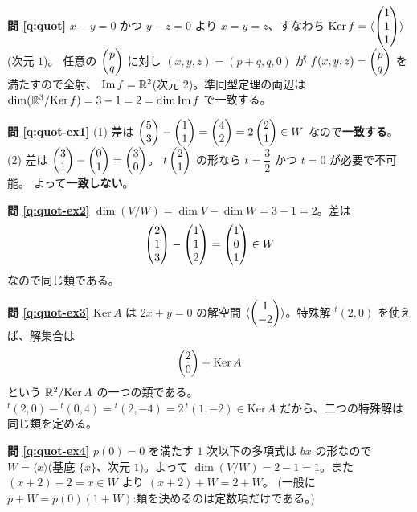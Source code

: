 \bigskip
\noindent\textbf{問 \ref{q:quot}}\quad
$x - y = 0$ かつ $y - z = 0$ より $x = y = z$、すなわち
$\mathrm{Ker}\,f = \langle \begin{pmatrix}1 \\ 1 \\ 1\end{pmatrix} \rangle$(次元 $1$)。
任意の $\begin{pmatrix}p \\ q\end{pmatrix}$ に対し $(x, y, z) = (p + q, q, 0)$ が
$f(x,y,z) = \begin{pmatrix}p \\ q\end{pmatrix}$ を満たすので全射、
$\mathrm{Im}\,f = \mathbb{R}^2$(次元 $2$)。準同型定理の両辺は
$\dim(\mathbb{R}^3/\mathrm{Ker}\,f) = 3 - 1 = 2 = \dim \mathrm{Im}\,f$ で一致する。

\bigskip
\noindent\textbf{問 \ref{q:quot-ex1}}\quad
(1) 差は $\begin{pmatrix}5 \\ 3\end{pmatrix} - \begin{pmatrix}1 \\ 1\end{pmatrix} = \begin{pmatrix}4 \\ 2\end{pmatrix} = 2\begin{pmatrix}2 \\ 1\end{pmatrix} \in W$
なので\textbf{一致する}。
(2) 差は $\begin{pmatrix}3 \\ 1\end{pmatrix} - \begin{pmatrix}0 \\ 1\end{pmatrix} = \begin{pmatrix}3 \\ 0\end{pmatrix}$。
$t\begin{pmatrix}2 \\ 1\end{pmatrix}$ の形なら $t = \dfrac{3}{2}$ かつ $t = 0$ が必要で不可能。
よって\textbf{一致しない}。

\bigskip
\noindent\textbf{問 \ref{q:quot-ex2}}\quad
$\dim(V/W) = \dim V - \dim W = 3 - 1 = 2$。差は
\[
\begin{pmatrix}2 \\ 1 \\ 3\end{pmatrix} - \begin{pmatrix}1 \\ 1 \\ 2\end{pmatrix} = \begin{pmatrix}1 \\ 0 \\ 1\end{pmatrix} \in W
\]
なので同じ類である。

\bigskip
\noindent\textbf{問 \ref{q:quot-ex3}}\quad
$\mathrm{Ker}\,A$ は $2x + y = 0$ の解空間
$\langle \begin{pmatrix}1 \\ -2\end{pmatrix} \rangle$。特殊解 ${}^t(2, 0)$ を使えば、解集合は
\[
\begin{pmatrix}2 \\ 0\end{pmatrix} + \mathrm{Ker}\,A
\]
という $\mathbb{R}^2/\mathrm{Ker}\,A$ の一つの類である。
${}^t(2, 0) - {}^t(0, 4) = {}^t(2, -4) = 2\,{}^t(1, -2) \in \mathrm{Ker}\,A$
だから、二つの特殊解は同じ類を定める。

\bigskip
\noindent\textbf{問 \ref{q:quot-ex4}}\quad
$p(0) = 0$ を満たす $1$ 次以下の多項式は $bx$ の形なので
$W = \langle x \rangle$(基底 $\{x\}$、次元 $1$)。よって
$\dim(V/W) = 2 - 1 = 1$。また $(x + 2) - 2 = x \in W$ より
$(x + 2) + W = 2 + W$。
(一般に $p + W = p(0)(1 + W)$:類を決めるのは定数項だけである。)

